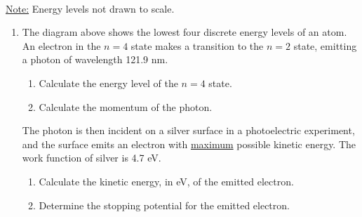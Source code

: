 \documentclass{../../../oss-apphys}
\begin{document}
\begin{center}
  \\
  \underline{Note:} Energy levels not drawn to scale.
\end{center}
\begin{enumerate}[leftmargin=15pt]

\item The diagram above shows the lowest four discrete energy levels of an
  atom. An electron in the $n=4$ state makes a transition to the $n=2$ state,
  emitting a photon of wavelength 121.9 nm.
  \begin{enumerate}[leftmargin=18pt]
  \item Calculate the energy level of the $n=4$ state.
  \item Calculate the momentum of the photon.
  \end{enumerate}
  The photon is then incident on a silver surface in a photoelectric
  experiment, and the surface emits an electron with \underline{maximum}
  possible kinetic energy. The work function of silver is 4.7 eV.
  \begin{enumerate}[leftmargin=18pt,resume]
  \item Calculate the kinetic energy, in eV, of the emitted electron.
  \item Determine the stopping potential for the emitted electron.
  \end{enumerate}
  \newpage
  

\end{enumerate}
\end{document}
